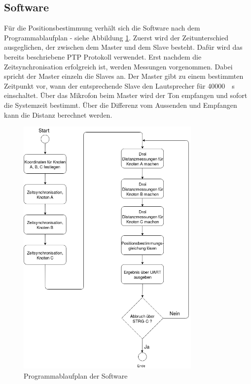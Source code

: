 \subsection{Software}
Für die Positionsbestimmung verhält sich die Software nach dem Programmablaufplan - siehe Abbildung \ref{img:PAP}. Zuerst wird der Zeitunterschied ausgeglichen, der zwischen dem Master und dem Slave besteht. Dafür wird das bereits beschriebene PTP Protokoll verwendet. Erst nachdem die Zeitsynchronisation erfolgreich ist, werden Messungen vorgenommen. Dabei spricht der Master einzeln die Slaves an. Der Master gibt zu einem bestimmten Zeitpunkt vor, wann der entsprechende Slave den Lautsprecher für \SI{40000}{\mu\s} einschaltet. Über das Mikrofon beim Master wird der Ton empfangen und sofort die Systemzeit bestimmt. Über die Differenz vom Aussenden und Empfangen kann die Distanz berechnet werden.
\begin{figure}[H]
        \centering
        \includegraphics[width=0.8\textwidth]{images/PAP.png}
        \caption{Programmablaufplan der Software}
        \label{img:PAP}
\end{figure}

